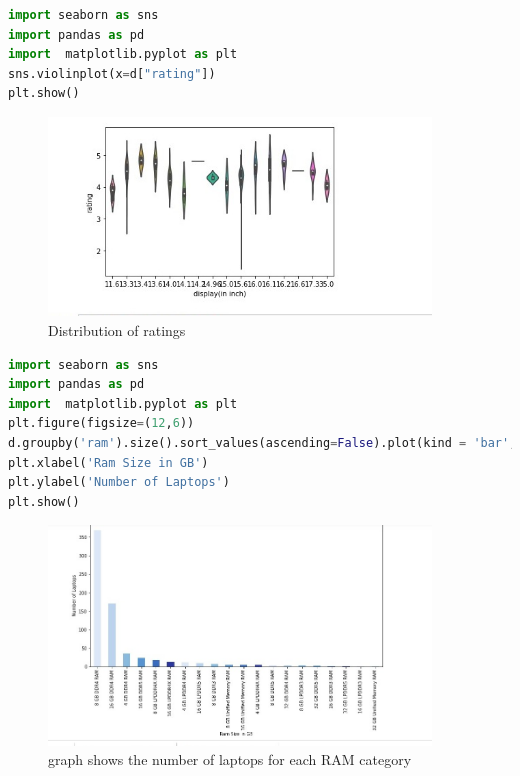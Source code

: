 \begin{lstlisting}[language=Python]
import seaborn as sns
import pandas as pd
import  matplotlib.pyplot as plt
sns.violinplot(x=d["rating"])
plt.show()
\end{lstlisting}
\begin{figure}[h]
\centering
 \footnotesize
 \includegraphics[width=4in]{8.png}
\caption{Distribution of ratings}
\label{fig:dunnhalftone}
\end{figure} 
\begin{lstlisting}[language=Python]
import seaborn as sns
import pandas as pd
import  matplotlib.pyplot as plt
plt.figure(figsize=(12,6))
d.groupby('ram').size().sort_values(ascending=False).plot(kind = 'bar',color = sns.color_palette('Blues'))
plt.xlabel('Ram Size in GB')
plt.ylabel('Number of Laptops')
plt.show()
\end{lstlisting}
\begin{figure}[h]
\centering
 \footnotesize
 \includegraphics[width=4in]{9.png}
\caption{ graph shows the number of laptops for each RAM category}
\label{fig:dunnhalftone}
\end{figure} 

